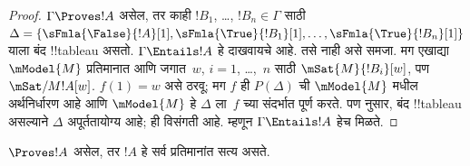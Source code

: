 \documentclass[../../../include/open-logic-section]{subfiles}
\begin{document}
\begin{proof}
  $\Gamma \Proves !A$ असेल,
  तर काही
  $!B_1$, \dots, $!B_n \in
  \Gamma$ साठी
  $\Delta = \{\sFmla{\False}{!A}[1], \sFmla{\True}{!B_1}[1],
  \dots, \sFmla{\True}{!B_n}[1]\}$
  याला बंद !!{tableau} असतो.
  $\Gamma \Entails !A$
  हे दाखवायचे आहे. तसे नाही
  असे समजा. मग एखाद्या
  $\mModel{M}$ प्रतिमानात
  आणि जगात~$w$,
  $i=1$, \dots,~$n$ साठी
  $\mSat{M}{!B_i}[w]$,
  पण $\mSat/{M}{!A}[w]$.
  $f(1) = w$ असे ठरवू;
  मग $f$ ही
  $P(\Delta)$ ची
  $\mModel{M}$ मधील
  अर्थनिर्धारण आहे आणि
  $\mModel{M}$ हे
  $\Delta$ ला~$f$ च्या
  संदर्भात पूर्ण करते.
  पण 
  नुसार, बंद !!{tableau}
  असल्याने $\Delta$
  अपूर्ततायोग्य आहे; ही
  विसंगती आहे. म्हणून
  $\Gamma \Entails !A$
  हेच मिळते.
\end{proof}

\begin{cor}
$\Proves !A$ असेल, तर
$!A$ हे सर्व प्रतिमानांत
सत्य असते.
\end{cor}
\end{document}
